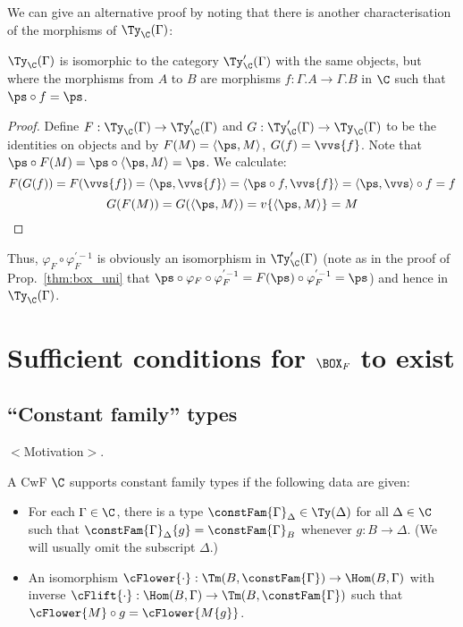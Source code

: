 \documentclass{article}
\begin{document}
We can give an alternative proof by noting that there is another
characterisation of the morphisms of $\Ty_{\C}(\Gamma)$:

\begin{proposition}
  $\Ty_{\C}(\Gamma)$ is isomorphic to the category $\Ty'_{\C}(\Gamma)$
  with the same objects, but where the morphisms from $A$ to $B$ are morphisms $f : \Gamma . A \to \Gamma . B$ in $\C$ such that $\ps \circ f = \ps$.
\end{proposition}
\begin{proof}
  Define $F : \Ty_{\C}(\Gamma) \to \Ty'_{\C}(\Gamma)$ and $G :
  \Ty'_{\C}(\Gamma) \to \Ty_{\C}(\Gamma)$ to be the identities on
  objects and by $F(M) = \langle \ps, M\rangle$, $G(f) =
  \vvs\{f\}$. Note that $\ps \circ F(M) = \ps \circ \langle \ps , M
  \rangle = \ps$. We calculate:
\[    F(G(f)) = F(\vvs\{f\}) = \langle \ps, \vvs\{f\}\rangle = \langle \ps \circ f, \vvs\{f\}\rangle = \langle \ps , \vvs\rangle \circ f = f \]\[
    G(F(M)) = G(\langle \ps, M\rangle) = v\{\langle \ps , M\rangle\} = M
\]
\end{proof}

Thus, $\varphi_F \circ \varphi_F^{'-1}$ is obviously an isomorphism in
$\Ty'_{\C}(\Gamma)$ (note as in the proof of Prop.~\ref{thm:box_uni} that $\ps \circ \varphi_F \circ
\varphi_F^{'-1} = F(\ps) \circ \varphi_F^{'-1} = \ps$) and hence in
$\Ty_{\C}(\Gamma)$.

\section{Sufficient conditions for $\BOX_F$ to exist}

\subsection{``Constant family'' types}

$<$Motivation$>$.

\begin{definition}
  A CwF $\C$ supports constant family types if the following data are given:
  \begin{itemize}
  \item For each $\Gamma \in \C$, there is a type $\constFam{\Gamma}_{\Delta} \in
    \Ty(\Delta)$ for all $\Delta \in \C$ such that
    $
    \constFam{\Gamma}_{\Delta}\{g\} = \constFam{\Gamma}_{B}
    $
    whenever $g : B \to \Delta$. (We will usually omit the subscript $\Delta$.)
  \item An isomorphism $\cFlower{\cdot} : \Tm(B, \constFam{\Gamma})
    \to \Hom(B, \Gamma)$ with inverse $\cFlift{\cdot} : \Hom(B,
    \Gamma) \to \Tm(B, \constFam{\Gamma})$ such that $\cFlower{M}
    \circ g = \cFlower{M\{g\}}$.
  \end{itemize}
\end{definition}
\end{document}
